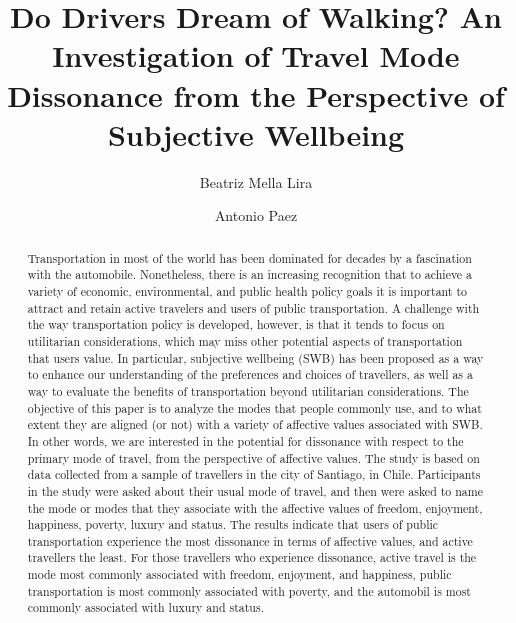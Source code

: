 \documentclass[]{elsarticle} %
\begin{document}
\begin{frontmatter}

  \title{Do Drivers Dream of Walking? An Investigation of Travel Mode Dissonance
from the Perspective of Subjective Wellbeing}
    \author[University College London]{Beatriz Mella Lira}
    \author[McMaster University]{Antonio Paez}
  
      \address[University College London]{Bartlett School of Planning, Sixth Floor, Central House, 14 Upper Woburn
Place, London, WC1H0NN UK}
    \address[McMaster University]{School of Geography and Earth Sciences, 1280 Main St W, Hamilton,
Ontario, L8S 1S4 Canada}
  
  \begin{abstract}
  Transportation in most of the world has been dominated for decades by a
  fascination with the automobile. Nonetheless, there is an increasing
  recognition that to achieve a variety of economic, environmental, and
  public health policy goals it is important to attract and retain active
  travelers and users of public transportation. A challenge with the way
  transportation policy is developed, however, is that it tends to focus
  on utilitarian considerations, which may miss other potential aspects of
  transportation that users value. In particular, subjective wellbeing
  (SWB) has been proposed as a way to enhance our understanding of the
  preferences and choices of travellers, as well as a way to evaluate the
  benefits of transportation beyond utilitarian considerations. The
  objective of this paper is to analyze the modes that people commonly
  use, and to what extent they are aligned (or not) with a variety of
  affective values associated with SWB. In other words, we are interested
  in the potential for dissonance with respect to the primary mode of
  travel, from the perspective of affective values. The study is based on
  data collected from a sample of travellers in the city of Santiago, in
  Chile. Participants in the study were asked about their usual mode of
  travel, and then were asked to name the mode or modes that they
  associate with the affective values of freedom, enjoyment, happiness,
  poverty, luxury and status. The results indicate that users of public
  transportation experience the most dissonance in terms of affective
  values, and active travellers the least. For those travellers who
  experience dissonance, active travel is the mode most commonly
  associated with freedom, enjoyment, and happiness, public transportation
  is most commonly associated with poverty, and the automobil is most
  commonly associated with luxury and status.
  \end{abstract}
  
 \end{frontmatter}
\end{document}
